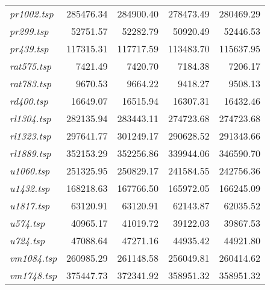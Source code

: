 {\begin{longtable}[H]{lrrrr}
\textit{pr1002.tsp} & 285476.34 & 284900.40 & 278473.49 & 280469.29\\
\textit{pr299.tsp} & 52751.57 & 52282.79 & 50920.49 & 52446.53\\
\textit{pr439.tsp} & 117315.31 & 117717.59 & 113483.70 & 115637.95\\
\textit{rat575.tsp} & 7421.49 & 7420.70 & 7184.38 & 7206.17\\
\textit{rat783.tsp} & 9670.53 & 9664.22 & 9418.27 & 9508.13\\
\textit{rd400.tsp} & 16649.07 & 16515.94 & 16307.31 & 16432.46\\
\textit{rl1304.tsp} & 282135.94 & 283443.11 & 274723.68 & 274723.68\\
\textit{rl1323.tsp} & 297641.77 & 301249.17 & 290628.52 & 291343.66\\
\textit{rl1889.tsp} & 352153.29 & 352256.86 & 339944.06 & 346590.70\\
\textit{u1060.tsp} & 251325.95 & 250829.17 & 241584.55 & 242756.36\\
\textit{u1432.tsp} & 168218.63 & 167766.50 & 165972.05 & 166245.09\\
\textit{u1817.tsp} & 63120.91 & 63120.91 & 62143.87 & 62035.52\\
\textit{u574.tsp} & 40965.17 & 41019.72 & 39122.03 & 39867.53\\
\textit{u724.tsp} & 47088.64 & 47271.16 & 44935.42 & 44921.80\\
\textit{vm1084.tsp} & 260985.29 & 261148.58 & 256049.81 & 260414.62\\
\textit{vm1748.tsp} & 375447.73 & 372341.92 & 358951.32 & 358951.32\\
\hline
\end{longtable}
}
\vspace{4cm}
